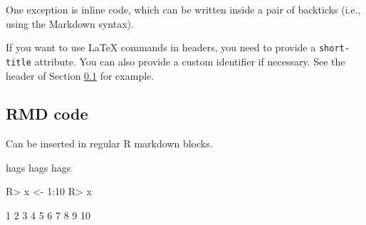 \documentclass[
  shortnames]{jss}
\begin{document}
One exception is inline code, which can be written inside a pair of
backticks (i.e., using the Markdown syntax).

If you want to use LaTeX commands in headers, you need to provide a
\texttt{short-title} attribute. You can also provide a custom identifier
if necessary. See the header of Section \ref{r-code} for example.

\subsection[R code]{RMD  code}\label{r-code}

Can be inserted in regular R markdown blocks.

hags hags hags \cite{Neal2004}

\begin{CodeChunk}
\begin{CodeInput}
R> x <- 1:10
R> x
\end{CodeInput}
\begin{CodeOutput}
 [1]  1  2  3  4  5  6  7  8  9 10
\end{CodeOutput}
\end{CodeChunk}


\end{document}
